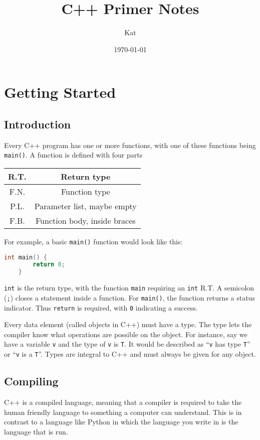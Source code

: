 \documentclass[12pt, a4paper]{report}
\title{C++ Primer Notes}
\author{Kat}
\date{\today}
\begin{document}
\maketitle
\tableofcontents
\newpage
\chapter{Getting Started}
\section{Introduction}
Every C++ program has one or more functions, with one of these functions being \verb|main()|. A function is defined with four parts
\begin{center}
  \begin{tabular}{ |c|c| }
    \hline
    R.T. & Return type \\
    \hline
    F.N. & Function type \\
    \hline
    P.L. & Parameter list, maybe empty \\
    \hline
    F.B. & Function body, inside braces \\
    \hline
  \end{tabular}
\end{center}
For example, a basic \verb|main()| function would look like this:
\begin{center}
  \begin{lstlisting}[language=C++]
    int main() { 
        return 0;
    }
  \end{lstlisting}
\end{center}
\verb|int| is the return type, with the function \verb|main| requiring an \verb|int| R.T. A semicolon (\verb|;|) closes a statement inside a function. For \verb|main()|, the function returns a status indicator. Thus \verb|return| is required, with \verb|0| indicating a success.

Every data element (called objects in C++) must have a type. The type lets the compiler know what operations are possible on the object. 
For instance, say we have a variable \verb|v| and the type of \verb|v| is \verb|T|. It would be described as ``\verb|v| has type \verb|T|''
or ``\verb|v| is a \verb|T|''. Types are integral to C++ and must always be given for any object.
\section{Compiling}
C++ is a compiled language, meaning that a compiler is required to take the human friendly language to something a computer can understand.
This is in contrast to a language like Python in which the language you write in is the language that is run.
\end{document}
